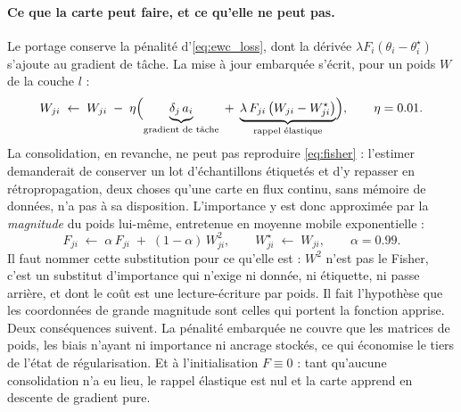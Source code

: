 \paragraph{Ce que la carte peut faire, et ce qu'elle ne peut pas.} Le portage conserve la pénalité
d'\eqref{eq:ewc_loss}, dont la dérivée $\lambda F_i (\theta_i - \theta^\star_i)$ s'ajoute au gradient
de tâche. La mise à jour embarquée s'écrit, pour un poids $W$ de la couche $l$ :
\begin{equation}
\label{eq:board_sgd}
W_{ji} \;\leftarrow\; W_{ji} \;-\; \eta \Bigl(
\underbrace{\delta_j \, a_i}_{\text{gradient de tâche}}
\;+\; \underbrace{\lambda \, F_{ji} \,\bigl(W_{ji} - W^\star_{ji}\bigr)}_{\text{rappel élastique}}
\Bigr),
\qquad \eta = 0.01 .
\end{equation}
La consolidation, en revanche, ne peut pas reproduire \eqref{eq:fisher} : l'estimer demanderait de
conserver un lot d'échantillons étiquetés et d'y repasser en rétropropagation, deux choses qu'une
carte en flux continu, sans mémoire de données, n'a pas à sa disposition. L'importance y est donc
approximée par la \emph{magnitude} du poids lui-même, entretenue en moyenne mobile exponentielle :
\begin{equation}
\label{eq:board_fisher}
F_{ji} \;\leftarrow\; \alpha \, F_{ji} \;+\; (1-\alpha) \, W_{ji}^2 ,
\qquad
W^\star_{ji} \;\leftarrow\; W_{ji} ,
\qquad \alpha = \num{0.99} .
\end{equation}
Il faut nommer cette substitution pour ce qu'elle est : $W^2$ n'est pas le Fisher, c'est un
substitut d'importance qui n'exige ni donnée, ni étiquette, ni passe arrière, et dont le coût est une
lecture-écriture par poids. Il fait l'hypothèse que les coordonnées de grande magnitude sont celles
qui portent la fonction apprise. Deux conséquences suivent. La pénalité embarquée ne couvre que les
matrices de poids, les biais n'ayant ni importance ni ancrage stockés, ce qui économise le tiers de
l'état de régularisation. Et à l'initialisation $F \equiv 0$ : tant qu'aucune consolidation n'a eu
lieu, le rappel élastique est nul et la carte apprend en descente de gradient pure.

